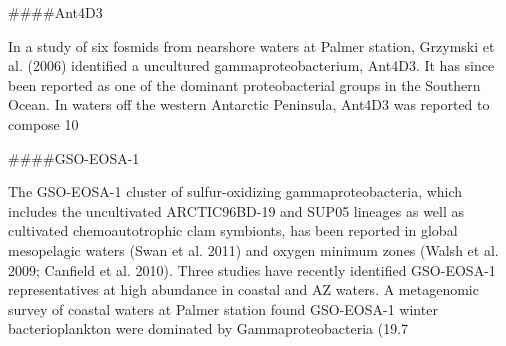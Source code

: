 ####Ant4D3

In a study of six fosmids from nearshore waters at Palmer station, Grzymski et al. (2006) identified a uncultured gammaproteobacterium, Ant4D3. It has since been reported as one of the dominant proteobacterial groups in the Southern Ocean. In waters off the western Antarctic Peninsula, Ant4D3 was reported to compose 10%

####GSO-EOSA-1

The GSO-EOSA-1 cluster of sulfur-oxidizing gammaproteobacteria, which includes the uncultivated ARCTIC96BD-19 and SUP05 lineages as well as cultivated chemoautotrophic clam symbionts, has been reported in global mesopelagic waters (Swan et al. 2011) and oxygen minimum zones (Walsh et al. 2009; Canfield et al. 2010). Three studies have recently identified GSO-EOSA-1 representatives at high abundance in coastal and AZ waters. A metagenomic survey of coastal waters at Palmer station found GSO-EOSA-1
winter bacterioplankton were dominated by Gammaproteobacteria (19.7%

